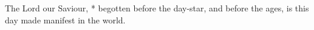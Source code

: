 The Lord our Saviour, * begotten before the day-star, and before the ages, is this day made manifest in the world.